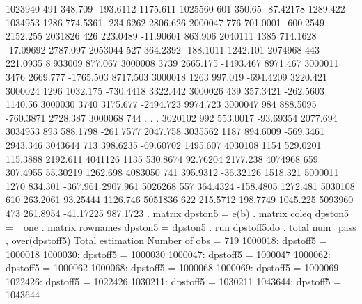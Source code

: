      1023940 {\VBAR}        491    348.709     -193.6112    1175.611
     1025560 {\VBAR}        601     350.65     -87.42178    1289.422
     1034953 {\VBAR}       1286   774.5361     -234.6262    2806.626
     2000047 {\VBAR}        776   701.0001     -600.2549    2152.255
     2031826 {\VBAR}        426   223.0489     -11.90601     863.906
     2040111 {\VBAR}       1385   714.1628     -17.09692    2787.097
     2053044 {\VBAR}        527   364.2392     -188.1011    1242.101
     2074968 {\VBAR}        443   221.0935      8.933009     877.067
     3000008 {\VBAR}       3739   2665.175     -1493.467    8971.467
     3000011 {\VBAR}       3476   2669.777     -1765.503    8717.503
     3000018 {\VBAR}       1263    997.019     -694.4209    3220.421
     3000024 {\VBAR}       1296   1032.175     -730.4418    3322.442
     3000026 {\VBAR}        439   357.3421     -262.5603     1140.56
     3000030 {\VBAR}       3740   3175.677     -2494.723    9974.723
     3000047 {\VBAR}        984   888.5095     -760.3871    2728.387
     3000068 {\VBAR}        744          .             .           .
     3020102 {\VBAR}        992   553.0017     -93.69354    2077.694
     3034953 {\VBAR}        893   588.1798     -261.7577    2047.758
     3035562 {\VBAR}       1187   894.6009     -569.3461    2943.346
     3043644 {\VBAR}        713   398.6235     -69.60702    1495.607
     4030108 {\VBAR}       1154   529.0201      115.3888    2192.611
     4041126 {\VBAR}       1135   530.8674      92.76204    2177.238
     4074968 {\VBAR}        659   307.4955      55.30219    1262.698
     4083050 {\VBAR}        741   395.9312     -36.32126    1518.321
     5000011 {\VBAR}       1270    834.301      -367.961    2907.961
     5026268 {\VBAR}        557   364.4324     -158.4805    1272.481
     5030108 {\VBAR}        610   263.2061      93.25444    1126.746
     5051836 {\VBAR}        622   215.5712      198.7749    1045.225
     5093960 {\VBAR}        473   261.8954     -41.17225    987.1723
{\smallskip}
. matrix dpston5 = e(b)
{\smallskip}
. matrix coleq dpston5 = _one
{\smallskip}
. matrix rownames dpston5 = dpston5
{\smallskip}
. run dpstoff5.do
{\smallskip}
. total num_pass , over(dpstoff5)
{\smallskip}
Total estimation                  Number of obs   =        719
{\smallskip}
      1000018: dpstoff5 = 1000018
      1000030: dpstoff5 = 1000030
      1000047: dpstoff5 = 1000047
      1000062: dpstoff5 = 1000062
      1000068: dpstoff5 = 1000068
      1000069: dpstoff5 = 1000069
      1022426: dpstoff5 = 1022426
      1030211: dpstoff5 = 1030211
      1043644: dpstoff5 = 1043644
